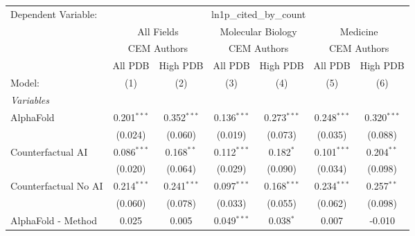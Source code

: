 \begingroup
\centering
\begin{tabular}{lcccccc}
   \tabularnewline \midrule \midrule
   Dependent Variable: & \multicolumn{6}{c}{ln1p\_cited\_by\_count}\\
 & \multicolumn{2}{c}{All Fields} & \multicolumn{2}{c}{Molecular Biology} & \multicolumn{2}{c}{Medicine} \\
\cmidrule(lr){2-3} \cmidrule(lr){4-5} \cmidrule(lr){6-7}
 & \multicolumn{2}{c}{CEM Authors} & \multicolumn{2}{c}{CEM Authors} & \multicolumn{2}{c}{CEM Authors} \\
\cmidrule(lr){2-3} \cmidrule(lr){4-5} \cmidrule(lr){6-7}
 & \multicolumn{1}{c}{All PDB} & \multicolumn{1}{c}{High PDB} & \multicolumn{1}{c}{All PDB} & \multicolumn{1}{c}{High PDB} & \multicolumn{1}{c}{All PDB} & \multicolumn{1}{c}{High PDB} \\
\cmidrule(lr){2-2} \cmidrule(lr){3-3} \cmidrule(lr){4-4} \cmidrule(lr){5-5} \cmidrule(lr){6-6} \cmidrule(lr){7-7}
   Model:                                                     & (1)           & (2)           & (3)           & (4)           & (5)           & (6)\\  
   \midrule
   \emph{Variables}\\
   AlphaFold                                                  & 0.201$^{***}$ & 0.352$^{***}$ & 0.136$^{***}$ & 0.273$^{***}$ & 0.248$^{***}$ & 0.320$^{***}$\\   
                                                              & (0.024)       & (0.060)       & (0.019)       & (0.073)       & (0.035)       & (0.088)\\   
   Counterfactual AI                                          & 0.086$^{***}$ & 0.168$^{**}$  & 0.112$^{***}$ & 0.182$^{*}$   & 0.101$^{***}$ & 0.204$^{**}$\\   
                                                              & (0.020)       & (0.064)       & (0.029)       & (0.090)       & (0.034)       & (0.098)\\   
   Counterfactual No AI                                       & 0.214$^{***}$ & 0.241$^{***}$ & 0.097$^{***}$ & 0.168$^{***}$ & 0.234$^{***}$ & 0.257$^{**}$\\   
                                                              & (0.060)       & (0.078)       & (0.033)       & (0.055)       & (0.062)       & (0.098)\\   
   AlphaFold - Method                                         & 0.025         & 0.005         & 0.049$^{***}$ & 0.038$^{*}$   & 0.007         & -0.010\\   

\end{tabular}
